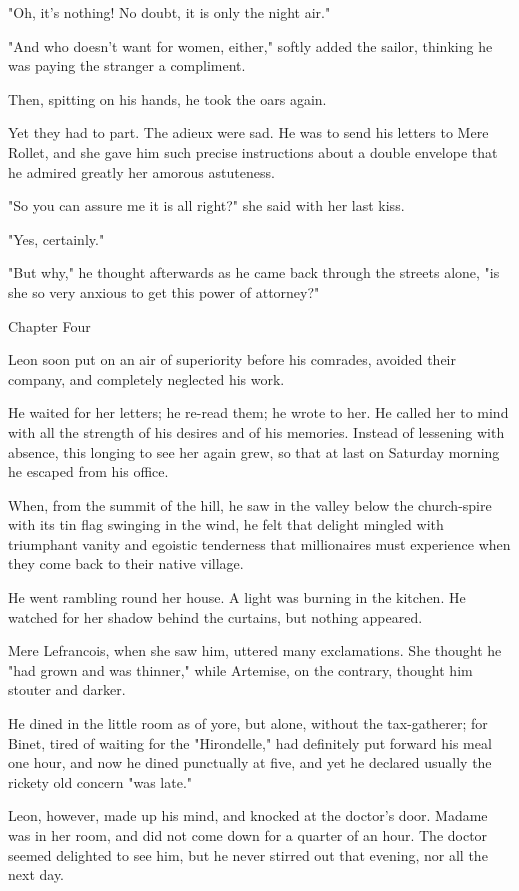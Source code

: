 \documentclass[11pt,twocolumn]{ltugboat}
\begin{document}
"Oh, it's nothing! No doubt, it is only the night air."

"And who doesn't want for women, either," softly added the sailor,
thinking he was paying the stranger a compliment.

Then, spitting on his hands, he took the oars again.

Yet they had to part. The adieux were sad. He was to send his letters to
Mere Rollet, and she gave him such precise instructions about a double
envelope that he admired greatly her amorous astuteness.

"So you can assure me it is all right?" she said with her last kiss.

"Yes, certainly."

"But why," he thought afterwards as he came back through the streets
alone, "is she so very anxious to get this power of attorney?"



Chapter Four

Leon soon put on an air of superiority before his comrades, avoided
their company, and completely neglected his work.

He waited for her letters; he re-read them; he wrote to her. He called
her to mind with all the strength of his desires and of his memories.
Instead of lessening with absence, this longing to see her again grew,
so that at last on Saturday morning he escaped from his office.

When, from the summit of the hill, he saw in the valley below the
church-spire with its tin flag swinging in the wind, he felt that
delight mingled with triumphant vanity and egoistic tenderness that
millionaires must experience when they come back to their native
village.

He went rambling round her house. A light was burning in the kitchen. He
watched for her shadow behind the curtains, but nothing appeared.

Mere Lefrancois, when she saw him, uttered many exclamations. She
thought he "had grown and was thinner," while Artemise, on the contrary,
thought him stouter and darker.

He dined in the little room as of yore, but alone, without the
tax-gatherer; for Binet, tired of waiting for the "Hirondelle," had
definitely put forward his meal one hour, and now he dined punctually at
five, and yet he declared usually the rickety old concern "was late."

Leon, however, made up his mind, and knocked at the doctor's door.
Madame was in her room, and did not come down for a quarter of an hour.
The doctor seemed delighted to see him, but he never stirred out that
evening, nor all the next day.
\end{document}
